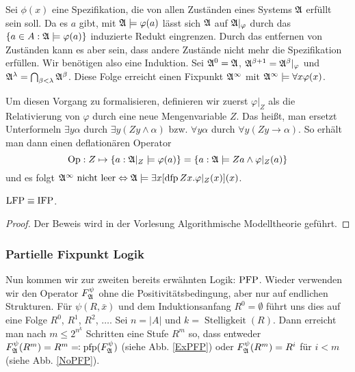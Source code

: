 \begin{example}
	Sei $\phi(x)$ eine Spezifikation, die von allen Zuständen eines Systems $\mathfrak{A}$ erfüllt sein soll. Da es $a$ gibt, mit $\mathfrak{A}\models \varphi(a)$ lässt sich $\mathfrak{A}$ auf $\mathfrak{A}\vert_\varphi$ durch das $\{a\in A : \mathfrak{A}\models \varphi(a)\}$ induzierte Redukt eingrenzen. 
	Durch das entfernen von Zuständen kann es aber sein, dass andere Zustände nicht mehr die Spezifikation erfüllen. Wir benötigen also eine Induktion. 
	Sei $\mathfrak{A}^0=\mathfrak{A}$, $\mathfrak{A}^{\beta+1}=\mathfrak{A}^\beta\vert_\varphi$ und $\mathfrak{A}^\lambda=\bigcap_{\beta<\lambda}\mathfrak{A}^\beta$. Diese Folge erreicht einen Fixpunkt $\mathfrak{A}^\infty$ mit $\mathfrak{A}^\infty\models \forall x \varphi(x)$.
	
	Um diesen Vorgang zu formalisieren, definieren wir zuerst $\varphi\vert_Z$ als die Relativierung von $\varphi$ durch eine neue Mengenvariable $Z$. Das heißt, man ersetzt Unterformeln $\exists y \alpha$ durch $\exists y(Z y \land \alpha)$ bzw. $\forall y \alpha$ durch $\forall y (Zy\rightarrow \alpha)$. So erhält man dann einen deflationären Operator
	\[\operatorname{Op}:Z \mapsto \{a: \mathfrak{A}\vert_Z \models \varphi(a)\} = \{a : \mathfrak{A}\models Za \land \varphi\vert_Z(a)\}\]
	und es folgt $\mathfrak{A}^\infty \text{ nicht leer} \Leftrightarrow \mathfrak{A} \models \exists x [\operatorname{dfp} Zx . \varphi\vert_Z(x)](x)$.
\end{example}

\begin{satz}
	$\operatorname{LFP} \equiv \operatorname{IFP}$.
\end{satz}
\begin{proof}
	Der Beweis wird in der Vorlesung Algorithmische Modelltheorie geführt.
\end{proof}

\subsubsection*{Partielle Fixpunkt Logik}

Nun kommen wir zur zweiten bereits erwähnten Logik: $\operatorname{PFP}$. Wieder verwenden wir den Operator $F^\psi_{\mathfrak{A}}$ ohne die Positivitätsbedingung, aber nur auf endlichen Strukturen.
Für $\psi(R,\bar{x})$ und dem Induktionsanfang $R^0=\emptyset$ führt uns dies auf eine Folge $R^0$, $R^1$, $R^2$, $\dots$. Sei $n=\vert A \vert$ und $k=\operatorname{Stelligkeit}(R)$. Dann erreicht man nach $m\leq 2^{n^k}$ Schritten eine Stufe $R^m$ so, dass entweder $F^\psi_{\mathfrak{A}}(R^m)=R^m\eqqcolon \operatorname{pfp}(F^\psi_{\mathfrak{A}})$ (siehe Abb. \ref{ExPFP}) oder $F^\psi_{\mathfrak{A}}(R^m)=R^i$ für $i<m$ (siehe Abb. \ref{NoPFP}).

